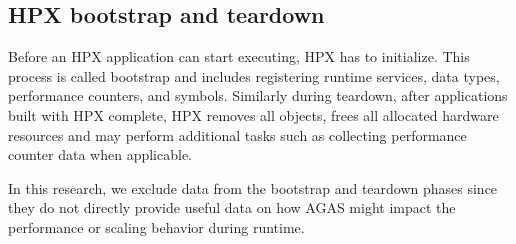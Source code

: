 \subsection{HPX bootstrap and teardown}
Before an HPX application can start executing, HPX has to initialize. This
process is called bootstrap and includes registering runtime services, data
types, performance counters, and symbols.
Similarly during teardown, after applications built with HPX complete, HPX removes all
objects, frees all allocated hardware resources and may perform additional
tasks such as collecting performance counter data when applicable.

In this research, we exclude data from the bootstrap and teardown phases since
they do not directly provide useful data on how AGAS might impact the
performance or scaling behavior during runtime.
